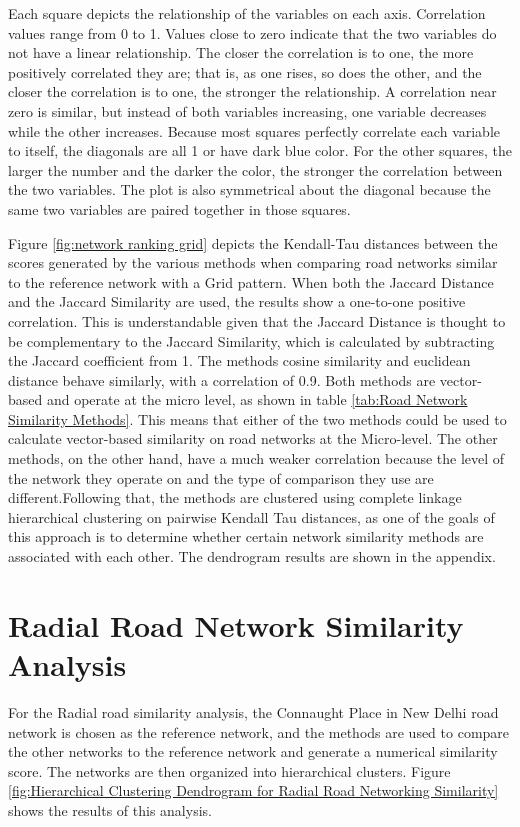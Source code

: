 Each square depicts the relationship of the variables on each axis. Correlation values range from 0 to 1. Values close to zero indicate that the two variables do not have a linear relationship. The closer the correlation is to one, the more positively correlated they are; that is, as one rises, so does the other, and the closer the correlation is to one, the stronger the relationship. A correlation near zero is similar, but instead of both variables increasing, one variable decreases while the other increases. Because most squares perfectly correlate each variable to itself, the diagonals are all 1 or have dark blue color. For the other squares, the larger the number and the darker the color, the stronger the correlation between the two variables. The plot is also symmetrical about the diagonal because the same two variables are paired together in those squares.

Figure \ref{fig:network ranking grid} depicts the Kendall-Tau distances between the scores generated by the various methods when comparing road networks similar to the reference network with a Grid pattern. When both the Jaccard Distance and the Jaccard Similarity are used, the results show a one-to-one positive correlation. This is understandable given that the Jaccard Distance is thought to be complementary to the Jaccard Similarity, which is calculated by subtracting the Jaccard coefficient from 1. The methods cosine similarity and euclidean distance behave similarly, with a correlation of 0.9. Both methods are vector-based and operate at the micro level, as shown in table \ref{tab:Road Network Similarity Methods}. This means that either of the two methods could be used to calculate vector-based similarity on road networks at the Micro-level. The other methods, on the other hand, have a much weaker correlation because the level of the network they operate on and the type of comparison they use are different.Following that, the methods are clustered using complete linkage hierarchical clustering on pairwise Kendall Tau distances, as one of the goals of this approach is to determine whether certain network similarity methods are associated with each other. The dendrogram results are shown in the appendix.

\section{Radial Road Network Similarity Analysis}

For the Radial road similarity analysis, the Connaught Place in New Delhi road network is chosen as the reference network, and the methods are used to compare the other networks to the reference network and generate a numerical similarity score. The networks are then organized into hierarchical clusters. Figure \ref{fig:Hierarchical Clustering Dendrogram for Radial Road Networking Similarity} shows the results of this analysis.

